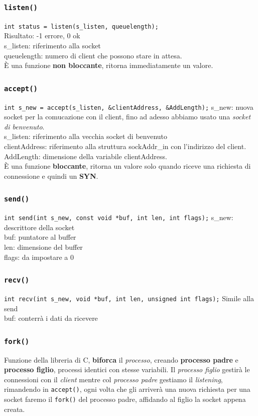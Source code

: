 \subsubsection*{\texttt{listen()}}
\texttt{int status = listen(s\_listen, queuelength);} \\ 
Risultato: -1 errore, 0 ok \\ 
s\_listen: riferimento alla socket \\ 
queuelength: numero di client che possono stare in attesa. \\ 
È una funzione \textbf{non bloccante}, ritorna immediatamente un valore. 

\subsubsection*{\texttt{accept()}}
\texttt{int s\_new = accept(s\_listen, \&clientAddress, \&AddLength);}
s\_new: nuova socket per la comucazione con il client, fino ad adesso abbiamo usato una \textit{socket di benvenuto}. \\ 
s\_listen: riferimento alla vecchia socket di benvenuto \\ 
clientAddress: riferimento alla struttura sockAddr\_in con l'indirizzo del client. \\ 
AddLength: dimensione della variabile clientAddress. \\ 
È una funzione \textbf{bloccante}, ritorna un valore solo quando riceve una richiesta di connessione e quindi un \textbf{SYN}.

\subsubsection*{\texttt{send()}}
\texttt{int send(int s\_new, const void *buf, int len, int flags);}
s\_new: descrittore della socket \\ 
buf: puntatore al buffer \\ 
len: dimensione del buffer \\ 
flags: da impostare a 0 

\subsubsection*{\texttt{recv()}}
\texttt{int recv(int s\_new, void *buf, int len, unsigned int flags);}
Simile alla send \\ 
buf: conterrà i dati da ricevere 

\subsubsection*{\texttt{fork()}}
Funzione della libreria di C, \textbf{biforca} il \textit{processo}, creando \textbf{processo padre} e \textbf{processo figlio}, processi identici con stesse variabili. Il \textit{processo figlio} gestirà le connessioni con il \textit{client} mentre col \textit{processo padre} gestiamo il \textit{listening}, rimandendo in \texttt{accept()}, ogni volta che gli arriverà una nuova richiesta per una socket faremo il \texttt{fork()} del processo padre, affidando al figlio la socket appena creata.


